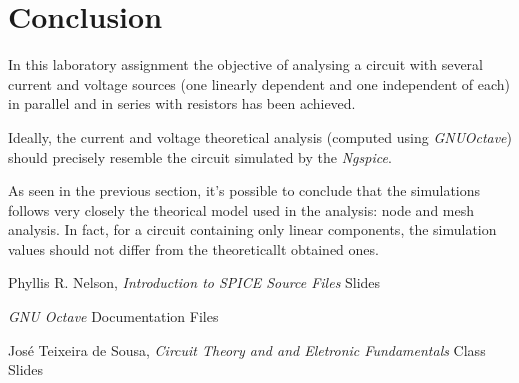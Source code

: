 \section{Conclusion}
\label{sec:conclusion}



In this laboratory assignment the objective of analysing a circuit with several current and voltage sources (one linearly dependent and one independent of each) in parallel and in series with resistors has been
achieved.

Ideally, the current and voltage theoretical analysis (computed using \textit{GNUOctave}) should precisely resemble the circuit simulated by the \textit{Ngspice}. 

As seen in the previous section, it's possible to conclude that the simulations follows very closely the theorical model used in the analysis: node and mesh analysis. In fact, for a circuit containing only linear components, the simulation values should not differ from the theoreticallt obtained ones.



\begin{thebibliography}{}

Phyllis R. Nelson, \emph{Introduction to SPICE Source Files} Slides

\emph{GNU Octave} Documentation Files 

José Teixeira de Sousa, \emph{Circuit Theory and and Eletronic Fundamentals} Class Slides

\end{thebibliography}
